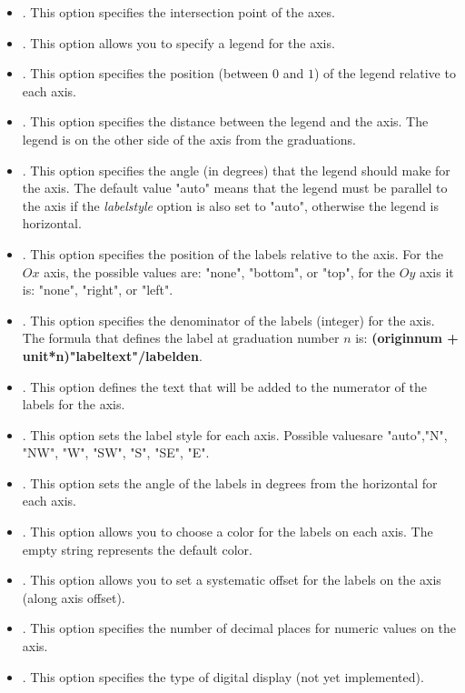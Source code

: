 \begin{itemize}
\begin{itemize}
    \item {}. This option specifies the intersection point of the axes. 
    \item {}. This option allows you to specify a legend for the axis.
    \item {}. This option specifies the position (between $0$ and $1$) of the legend relative to each axis.
    \item {}. This option specifies the distance between the legend and the axis. The legend is on the other side of the axis from the graduations.
    \item {}. This option specifies the angle (in degrees) that the legend should make for the axis. The default value "auto" means that the legend must be parallel to the axis if the \emph{labelstyle} option is also set to "auto", otherwise the legend is horizontal.
    \item {}. This option specifies the position of the labels relative to the axis. For the $Ox$ axis, the possible values ​​are: "none", "bottom", or "top", for the $Oy$ axis it is: "none", "right", or "left".
    \item {}. ​​This option specifies the denominator of the labels (integer) for the axis. The formula that defines the label at graduation number $n$ is: \textbf{(originnum + unit*n)"labeltext"/labelden}.
    \item {}. This option defines the text that will be added to the numerator of the labels for the axis.
    \item {}. This option sets the label style for each axis. Possible values ​​are "auto","N", "NW", "W", "SW", "S", "SE", "E".
    \item {}. This option sets the angle of the labels in degrees from the horizontal for each axis.
    \item {}. This option allows you to choose a color for the labels on each axis. The empty string represents the default color.
    \item {}. This option allows you to set a systematic offset for the labels on the axis (along axis offset).
    \item {}. This option specifies the number of decimal places for numeric values ​​on the axis.     \item {}. This option specifies the type of digital display (not yet implemented).

\end{itemize}
\end{itemize}

